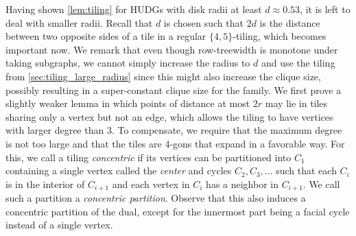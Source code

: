 \documentclass[a4paper,english,cleveref,thm-restate]{lipics-v2021}
\newcommand{\Thomas}[1]{\todo[inline,caption=,backgroundcolor=blue!25]{#1}}
\begin{document}
Having shown \cref{lem:tiling} for HUDGs with disk radii at least $ d \approx 0.53 $, it is left to deal with smaller radii.
Recall that $ d $ is chosen such that $ 2d $ is the distance between two opposite sides of a tile in a regular $ \{ 4, 5 \} $-tiling, which becomes important now.
We remark that even though row-treewidth is monotone under taking subgraphs, we cannot simply increase the radius to $ d $ and use the tiling from \cref{sec:tiling_large_radius} since this might also increase the clique size, possibly resulting in a super-constant clique size for the family.
We first prove a slightly weaker lemma in which points of distance at most $ 2r $ may lie in tiles sharing only a vertex but not an edge, which allows the tiling to have vertices with larger degree than 3.
To compensate, we require that the maximum degree is not too large and that the tiles are 4-gons that expand in a favorable way.
For this, we call a tiling \emph{concentric} if its vertices can be partitioned into $ C_1 $ containing a single vertex called the \emph{center} and cycles $ C_2, C_3, \dots $ such that each $ C_i $ is in the interior of $ C_{i + 1} $ and each vertex in $ C_i $ has a neighbor in $ C_{i + 1} $.
We call such a partition a \emph{concentric partition}.
Observe that this also induces a concentric partition of the dual, except for the innermost part being a facial cycle instead of a single vertex.

  
\end{document}
